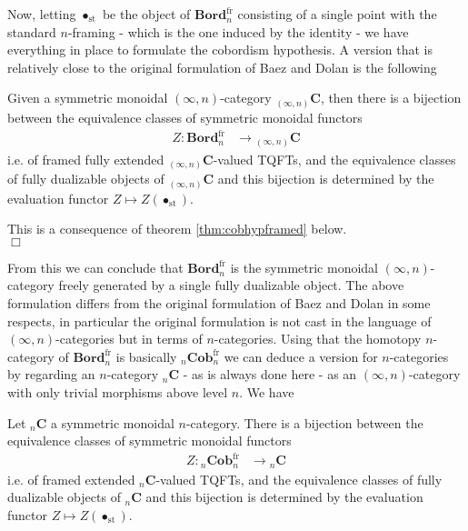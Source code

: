 Now, letting $\bullet_{\mathrm{st}}$ be the object of $\mathbf{Bord}_{n}^{\mathrm{fr}}$ consisting of a single point with the standard $n$-framing - which is the one induced by the identity - we have everything in place to formulate the cobordism hypothesis. A version that is relatively close to the original formulation of Baez and Dolan is the following
\\
\begin{thm}
\label{thm:cobhypprelim}
Given a symmetric monoidal $(\infty,n)$-category ${_{(\infty,n)}}\mathbf{C}$, then there is a bijection between the equivalence classes of symmetric monoidal functors 
\begin{align*}
  Z
  \colon
  \mathbf{Bord}_{n}^{\mathrm{fr}}
  &\to
  {_{(\infty,n)}}\mathbf{C}
\end{align*}
i.e. of framed fully extended ${_{(\infty,n)}}\mathbf{C}$-valued TQFTs, and the equivalence classes of fully dualizable objects of ${_{(\infty,n)}}\mathbf{C}$ and this bijection is determined by the evaluation functor $Z \mapsto Z(\bullet_{\mathrm{st}})$.
\end{thm}
\begin{prf}[Sketch]
This is a consequence of theorem \ref{thm:cobhypframed} below.
\\
\phantom{proven}
\hfill
$\Box$
\end{prf}
From this we can conclude that $\mathbf{Bord}_{n}^{\mathrm{fr}}$ is the symmetric monoidal $(\infty,n)$-category freely generated by a single fully dualizable object. The above formulation differs from the original formulation of Baez and Dolan in some respects, in particular the original formulation is not cast in the language of $(\infty,n)$-categories but in terms of $n$-categories. Using that the homotopy $n$-category of $\mathbf{Bord}_{n}^{\mathrm{fr}}$ is basically ${_{n}}\mathbf{Cob}_{n}^{\mathrm{fr}}$ we can deduce a version for $n$-categories by regarding an $n$-category ${_{n}}\mathbf{C}$ - as is always done here - as an $(\infty,n)$-category with only trivial morphisms above level $n$. We have
\\
\begin{cor}
\label{cor:cobhypncat}
Let ${_{n}}\mathbf{C}$ a symmetric monoidal $n$-category. There is a bijection between the equivalence classes of symmetric monoidal functors
\begin{align*}
  Z
  \colon
  {_{n}}\mathbf{Cob}_{n}^{\mathrm{fr}}
  &\to
  {_{n}}\mathbf{C}
\end{align*}
i.e. of framed extended ${_{n}}\mathbf{C}$-valued TQFTs, and the equivalence classes of fully dualizable objects of ${_{n}}\mathbf{C}$ and this bijection is determined by the evaluation functor $Z \mapsto Z(\bullet_{\mathrm{st}})$.
\end{cor}
